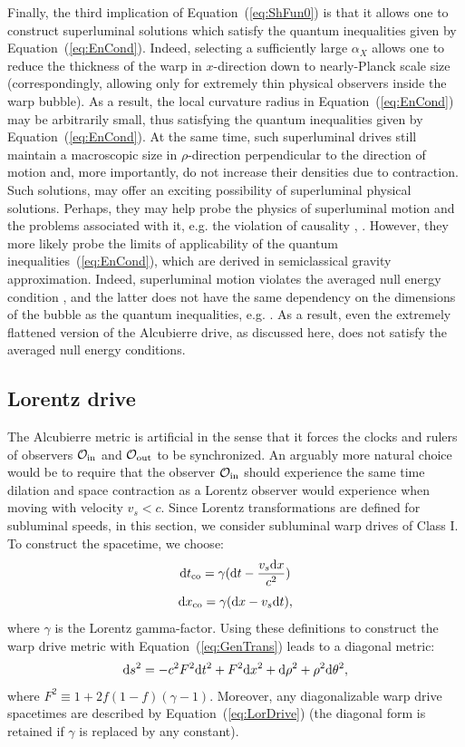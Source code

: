 \documentclass[10pt]{iopart}
\begin{document}
Finally, the third implication of Equation~(\ref{eq:ShFun0}) is that it allows one to construct superluminal solutions which satisfy the quantum inequalities given by Equation~(\ref{eq:EnCond}). Indeed, selecting a sufficiently large $\alpha_X$ allows one to reduce the thickness of the warp in $x$-direction down to nearly-Planck scale size (correspondingly, allowing only for extremely thin physical observers inside the warp bubble). As a result, the local curvature radius in Equation~(\ref{eq:EnCond}) may be arbitrarily small, thus satisfying the quantum inequalities given by Equation~(\ref{eq:EnCond}). At the same time, such superluminal drives still maintain a macroscopic size in $\rho$-direction perpendicular to the direction of motion and, more importantly, do not increase their densities due to contraction. Such solutions, may offer an exciting possibility of superluminal physical solutions. Perhaps, they may help probe the physics of superluminal motion and the problems associated with it, e.g. the violation of causality \cite{Krasnikov1998}, \cite{Everett1997}. However, they more likely probe the limits of applicability of the quantum inequalities~(\ref{eq:EnCond}), which are derived { in semiclassical gravity approximation. Indeed, superluminal motion violates the averaged null energy condition \cite{Visser2000}, and the latter does not have the same dependency on the dimensions of the bubble as the quantum inequalities, e.g. \cite{Graham2007}. As a result, even the extremely flattened version of the Alcubierre drive, as discussed here, does not satisfy the averaged null energy conditions.}


\subsection{Lorentz drive}

The Alcubierre metric is artificial in the sense that it forces the clocks and rulers of observers $\mathcal{O}_{\rm in}$ and $\mathcal{O}_{\rm out}$ to be synchronized. An arguably more natural choice would be to require that the observer $\mathcal{O}_{\rm in}$ should experience the same time dilation and space contraction as a Lorentz observer would experience when moving with velocity $v_s<c$. Since Lorentz transformations are defined for subluminal speeds, in this section, we consider subluminal warp drives of Class I. To construct the spacetime, we choose:
\begin{equation}
\label{eq:LorDrive}
    {\rm d}t_{\rm co}=\gamma({\rm d}t-\frac{v_s {\rm d}x}{c^2})
\end{equation}
\[
{\rm d}x_{\rm co}=\gamma ({\rm d}x-v_s {\rm d}t),
\]
where $\gamma$ is the Lorentz gamma-factor. Using these definitions to construct the warp drive metric with Equation~(\ref{eq:GenTrans}) leads to a diagonal metric:
\begin{equation}
{\rm d}s^2=-c^2 F^2{\rm d} t^2 + F^2{\rm d}x^2+{\rm d}\rho^2 + \rho^2{\rm d}\theta^2,
\end{equation}
where $F^2\equiv 1+2f(1-f)(\gamma -1)$. Moreover, any diagonalizable warp drive spacetimes are described by Equation~(\ref{eq:LorDrive}) (the diagonal form is retained if $\gamma$ is replaced by any constant).
\end{document}
